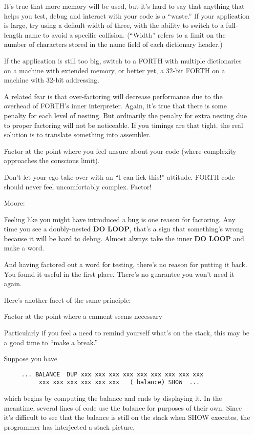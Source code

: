 It's true that more memory will be used, but it's hard to say that anything that helps you test, debug and interact with your code is a ``waste.'' If your application is large, try using a default width of three, with the ability to switch to a full-length name to avoid a specific collision. (``Width'' refers to a limit on the number of characters stored in the name field of each dictionary header.)

If the application is still too big, switch to a FORTH with multiple dictionaries on a machine with extended memory, or better yet, a 32-bit FORTH on a machine with 32-bit addressing.

A related fear is that over-factoring will decrease performance due to the overhead of FORTH's inner interpreter. Again, it's true that there is some penalty for each level of nesting. But ordinarily the penalty for extra nesting due to proper factoring will not be noticeable. If you timings are that tight, the real solution is to translate something into assembler.

\begin{tip}
Factor at the point where you feel unsure about your code (where complexity approaches the conscious limit).
\end{tip}
Don't let your ego take over with an ``I can lick this!'' attitude. FORTH code should never feel uncomfortably complex. Factor!

\bigskip
\blackline{2ex}
\noindent Moore:

\begin{tfquot}
Feeling like you might have introduced a bug is one reason for factoring. Any time you see a doubly-nested \textbf{DO LOOP}, that's a sign that something's wrong because it will be hard to debug. Almost always take the inner \textbf{DO LOOP} and make a word.

And having factored out a word for testing, there's no reason for putting it back. You found it useful in the first place. There's no guarantee you won't need it again.
\end{tfquot}
\blackline{1ex}
Here's another facet of the same principle:

\begin{tip}
Factor at the point where a cmment seems necessary
\end{tip}
Particularly if you feel a need to remind yourself what's on the stack, this may be a good time to ``make a break.''

Suppose you have

\begin{verbatim}
     ... BALANCE  DUP xxx xxx xxx xxx xxx xxx xxx xxx xxx
          xxx xxx xxx xxx xxx xxx   ( balance) SHOW  ...
\end{verbatim}
which begins by computing the balance and ends by displaying it. In the meantime, several lines of code use the balance for purposes of their own. Since it's difficult to see that the balance is still on the stack when SHOW executes, the programmer has interjected a stack picture.

